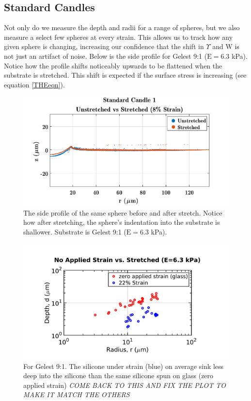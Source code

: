 \subsection{Standard Candles}
Not only do we measure the depth and radii for a range of spheres, but we also measure a select few spheres at every strain. This allows us to track how any given sphere is changing, increasing our confidence that the shift in $\Upsilon$ and W is not just an artifact of noise. Below is the side profile for Gelest 9:1 ($\text{E}=6.3$ kPa). Notice how the profile shifts noticeably upwards to be flattened when the substrate is stretched. This shift is expected if the surface stress is increasing (see equation \ref{THEeqn}).

\begin{figure}
	\centering
	\includegraphics[width=\linewidth]{Chapters/Figures/sc1_unstretched_v_8ml}
	\caption[Side Collapse Comparison]{The side profile of the same sphere before and after stretch. Notice how after stretching, the sphere's indentation into the substrate is shallower. Substrate is Gelest 9:1 ($\text{E}=6.3$ kPa).}	
	\label{fig:sc1unstretchedv8ml}
\end{figure}

\begin{figure}
	\centering
	\includegraphics[width=\linewidth]{Chapters/Figures/glass_vs_stretched_190218}
	\caption[Glass vs. Stretched d vs. R]{For Gelest 9:1. The silicone under strain (blue) on average sink less deep into the silicone than the same silicone spun on glass (zero applied strain) \emph{COME BACK TO THIS AND FIX THE PLOT TO MAKE IT MATCH THE OTHERS}}

	\label{fig:glassvsstretched190218}
\end{figure}

